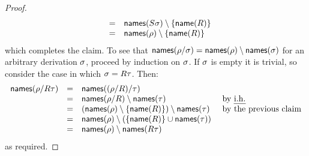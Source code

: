 \begin{proof}
\[\begin{array}{rcll}
                         & = & \mathsf{names}(S\sigma) \setminus \{\mathsf{name}(R)\} \\
                         & = & \mathsf{names}(\rho) \setminus \{\mathsf{name}(R)\} \\
  \end{array}
\]
which completes the claim.
To see that $\mathsf{names}(\rho/\sigma) = \mathsf{names}(\rho) \setminus \mathsf{names}(\sigma)$
for an arbitrary derivation $\sigma$,
proceed by induction on $\sigma$.
If $\sigma$ is empty it is trivial, so
consider the case in which $\sigma = R\tau$.
Then:
\[
  \begin{array}{rcll}
  \mathsf{names}(\rho/R\tau) & = & \mathsf{names}((\rho/R)/\tau) \\
                                     & = & \mathsf{names}(\rho/R) \setminus \mathsf{names}(\tau) & \text{ by {\em i.h.}} \\
                                     & = & (\mathsf{names}(\rho) \setminus \{\mathsf{name}(R)\}) \setminus \mathsf{names}(\tau) & \text{ by the previous claim} \\
                                     & = & \mathsf{names}(\rho) \setminus (\{\mathsf{name}(R)\} \cup \mathsf{names}(\tau)) \\
                                     & = & \mathsf{names}(\rho) \setminus \mathsf{names}(R\tau) \\
  \end{array}
\]
as required.
\end{proof}

